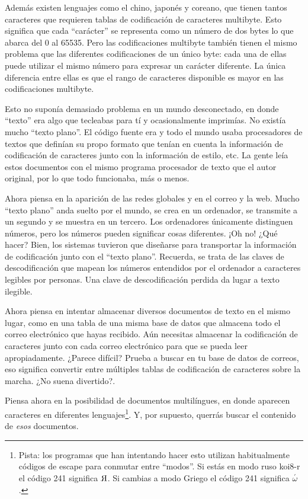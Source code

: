 Además existen lenguajes como el chino, japonés y coreano, que tienen tantos caracteres que requieren tablas de codificación de caracteres multibyte. Esto significa que cada ``carácter'' se representa como un número de dos bytes lo que abarca del 0 al 65535. Pero las codificaciones multibyte también tienen el mismo problema que las diferentes codificaciones de un único byte: cada una de ellas puede utilizar el mismo número para expresar un carácter diferente. La única diferencia entre ellas es que el rango de caracteres disponible es mayor en las codificaciones multibyte.

Esto no suponía demasiado problema en un mundo desconectado, en donde ``texto'' era algo que tecleabas para tí y ocasionalmente imprimías. No existía mucho ``texto plano''. El código fuente era  y todo el mundo usaba procesadores de textos que definían su propo formato que tenían en cuenta la información de codificación de caracteres junto con la información de estilo, etc. La gente leía estos documentos con el mismo programa procesador de texto que el autor original, por lo que todo funcionaba, más o menos.

Ahora piensa en la aparición de las redes globales y en el correo y la web. Mucho ``texto plano'' anda suelto por el mundo, se crea en un ordenador, se transmite a un segundo y se muestra en un tercero. Los ordenadores únicamente distinguen números, pero los números pueden significar cosas diferentes. ¡Oh no! ¿Qué hacer? Bien, los sistemas tuvieron que diseñarse para transportar la información de codificación junto con el ``texto plano''. Recuerda, se trata de las claves de descodificación que mapean los números entendidos por el ordenador a caracteres legibles por personas. Una clave de descodificación perdida da lugar a texto ilegible.

Ahora piensa en intentar almacenar diversos documentos de texto en el mismo lugar, como en una tabla de una misma base de datos que almacena todo el correo electrónico que hayas recibido. Aún necesitas almacenar la codificación de caracteres junto con cada correo electrónico para que se pueda leer apropiadamente. ¿Parece difícil? Prueba a buscar en tu base de datos de correos, eso significa convertir entre múltiples tablas de codificación de caracteres sobre la marcha. ¿No suena divertido?.

Piensa ahora en la posibilidad de documentos multilíngues, en donde aparecen caracteres en diferentes lenguajes\footnote{Pista: los programas que han intentando hacer esto utilizan habitualmente códigos de escape para conmutar entre ``modos''. Si estás en modo ruso koi8-r el código 241 significa $\reflectbox{R}$. Si cambias a modo Griego el código 241 significa $\stackrel{'}{\omega}$.}. Y, por supuesto, querrás buscar el contenido de \emph{esos} documentos.

